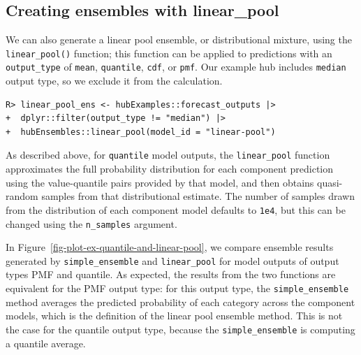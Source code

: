 \documentclass[
  article,
  shortnames,
  notitle]{jss}
\begin{document}
\subsection{Creating ensembles with
linear\_pool}\label{creating-ensembles-with-linear_pool}

We can also generate a linear pool ensemble, or distributional mixture,
using the \texttt{linear\_pool()} function; this function can be applied
to predictions with an \texttt{output\_type} of \texttt{mean},
\texttt{quantile}, \texttt{cdf}, or \texttt{pmf}. Our example hub
includes \texttt{median} output type, so we exclude it from the
calculation.

\begin{verbatim}
R> linear_pool_ens <- hubExamples::forecast_outputs |>
+  dplyr::filter(output_type != "median") |>
+  hubEnsembles::linear_pool(model_id = "linear-pool")
\end{verbatim}

As described above, for \texttt{quantile} model outputs, the
\texttt{linear\_pool} function approximates the full probability
distribution for each component prediction using the value-quantile
pairs provided by that model, and then obtains quasi-random samples from
that distributional estimate. The number of samples drawn from the
distribution of each component model defaults to \texttt{1e4}, but this
can be changed using the \texttt{n\_samples} argument.

In Figure~\ref{fig-plot-ex-quantile-and-linear-pool}, we compare
ensemble results generated by \texttt{simple\_ensemble} and
\texttt{linear\_pool} for model outputs of output types PMF and
quantile. As expected, the results from the two functions are equivalent
for the PMF output type: for this output type, the
\texttt{simple\_ensemble} method averages the predicted probability of
each category across the component models, which is the definition of
the linear pool ensemble method. This is not the case for the quantile
output type, because the \texttt{simple\_ensemble} is computing a
quantile average.
\end{document}
